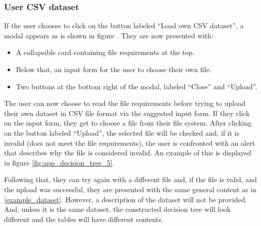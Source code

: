 \subsubsection{User CSV dataset}
If the user chooses to click on the button labeled ``Load own CSV dataset'', a modal appears as is shown in figure .
They are now presented with:
\begin{itemize}
    \item A collapsible card containing file requirements at the top.
    \item Below that, an input form for the user to choose their own file.
    \item Two buttons at the bottom right of the modal, labeled ``Close'' and ``Upload''.
\end{itemize}
The user can now choose to read the file requirements before trying to upload their own dataset in CSV file format via the suggested input form. If they click on the input form, they get to choose a file from their file system. After clicking on the button labeled ``Upload'', the selected file will be checked and, if it is invalid (does not meet the file requirements), the user is confronted with an alert that describes why the file is considered invalid. An example of this is displayed in figure \ref{fig:app_decision_tree_5}.

Following that, they can try again with a different file and, if the file is valid, and the upload was successful, they are presented with the same general content as in \ref{example_dataset}. However, a description of the dataset will not be provided. And, unless it is the same dataset, the constructed decision tree will look different and the tables will have different contents. 
